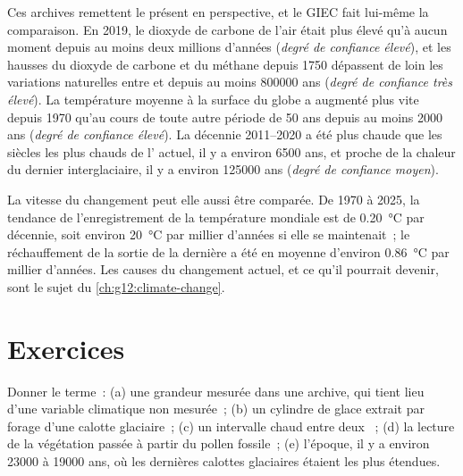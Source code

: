Ces archives remettent le présent en perspective, et le GIEC fait lui-même
la comparaison. En 2019, le dioxyde de carbone de l'air était plus élevé
qu'à aucun moment depuis au moins deux millions d'années (\emph{degré de
confiance élevé}), et les hausses du dioxyde de carbone et du méthane
depuis 1750 dépassent de loin les variations naturelles entre  et  depuis au moins \num{800000} ans
(\emph{degré de confiance très élevé}). La température moyenne à la
surface du globe a augmenté plus vite depuis 1970 qu'au cours de toute
autre période de 50 ans depuis au moins \num{2000} ans (\emph{degré de
confiance élevé}). La décennie 2011--2020 a été plus chaude que les
siècles les plus chauds de l' actuel, il y a environ
\num{6500} ans, et proche de la chaleur du dernier interglaciaire, il y a
environ \num{125000} ans (\emph{degré de confiance moyen}).

La vitesse du changement peut elle aussi être comparée. De 1970 à 2025, la
tendance de l'enregistrement de la température mondiale est de
\qty{0.20}{\degreeCelsius} par décennie, soit environ
\qty{20}{\degreeCelsius} par millier d'années si elle se maintenait~; le
réchauffement de la sortie de la dernière  a été en
moyenne d'environ \qty{0.86}{\degreeCelsius} par millier d'années. Les
causes du changement actuel, et ce qu'il pourrait devenir, sont le sujet
du \cref{ch:g12:climate-change}.

\section{Exercices}

\begin{exercise}[$\star$]\label{exo:g12:past-climates:1}
Donner le terme~: (a) une grandeur mesurée dans une archive, qui tient lieu
d'une variable climatique non mesurée~; (b) un cylindre de glace extrait
par forage d'une calotte glaciaire~; (c) un intervalle chaud entre deux
~; (d) la lecture de la végétation passée à partir du
pollen fossile~; (e) l'époque, il y a environ \num{23000} à \num{19000}
ans, où les dernières calottes glaciaires étaient les plus étendues.
\end{exercise}


